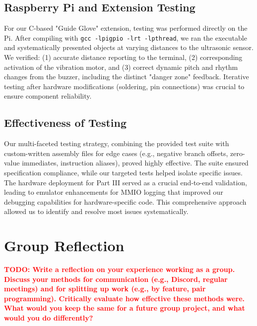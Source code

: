 \documentclass[11pt]{article}
\newcommand{\todo}[1]{\textcolor{red}{\textbf{TODO: #1}}}
\begin{document}
\subsection{Raspberry Pi and Extension Testing}
For our C-based "Guide Glove" extension, testing was performed directly on the Pi. After compiling with \texttt{gcc -lpigpio -lrt -lpthread}, we ran the executable and systematically presented objects at varying distances to the ultrasonic sensor. We verified: (1) accurate distance reporting to the terminal, (2) corresponding activation of the vibration motor, and (3) correct dynamic pitch and rhythm changes from the buzzer, including the distinct "danger zone" feedback. Iterative testing after hardware modifications (soldering, pin connections) was crucial to ensure component reliability.

\subsection{Effectiveness of Testing}
Our multi-faceted testing strategy, combining the provided test suite with custom-written assembly files for edge cases (e.g., negative branch offsets, zero-value immediates, instruction aliases), proved highly effective. The suite ensured specification compliance, while our targeted tests helped isolate specific issues. The hardware deployment for Part III served as a crucial end-to-end validation, leading to emulator enhancements for MMIO logging that improved our debugging capabilities for hardware-specific code. This comprehensive approach allowed us to identify and resolve most issues systematically.


\section{Group Reflection}
\todo{Write a reflection on your experience working as a group. Discuss your methods for communication (e.g., Discord, regular meetings) and for splitting up work (e.g., by feature, pair programming). Critically evaluate how effective these methods were. What would you keep the same for a future group project, and what would you do differently?}


\end{document}
